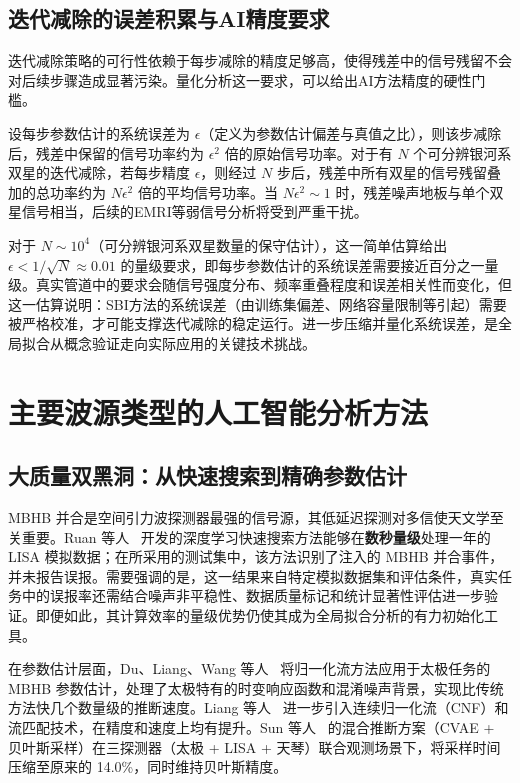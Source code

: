 \subsection{迭代减除的误差积累与AI精度要求}

迭代减除策略的可行性依赖于每步减除的精度足够高，使得残差中的信号残留不会对后续步骤造成显著污染。量化分析这一要求，可以给出AI方法精度的硬性门槛。

设每步参数估计的系统误差为 $\epsilon$（定义为参数估计偏差与真值之比），则该步减除后，残差中保留的信号功率约为 $\epsilon^2$ 倍的原始信号功率。对于有 $N$ 个可分辨银河系双星的迭代减除，若每步精度 $\epsilon$，则经过 $N$ 步后，残差中所有双星的信号残留叠加的总功率约为 $N\epsilon^2$ 倍的平均信号功率。当 $N\epsilon^2 \sim 1$ 时，残差噪声地板与单个双星信号相当，后续的EMRI等弱信号分析将受到严重干扰。

对于 $N\sim10^4$（可分辨银河系双星数量的保守估计），这一简单估算给出 $\epsilon < 1/\sqrt{N} \approx 0.01$ 的量级要求，即每步参数估计的系统误差需要接近百分之一量级。真实管道中的要求会随信号强度分布、频率重叠程度和误差相关性而变化，但这一估算说明：SBI方法的系统误差（由训练集偏差、网络容量限制等引起）需要被严格校准，才可能支撑迭代减除的稳定运行。进一步压缩并量化系统误差，是全局拟合从概念验证走向实际应用的关键技术挑战。

\section{主要波源类型的人工智能分析方法}

\subsection{大质量双黑洞：从快速搜索到精确参数估计}

MBHB 并合是空间引力波探测器最强的信号源，其低延迟探测对多信使天文学至关重要。Ruan 等人~\cite{ruan2023mbhb} 开发的深度学习快速搜索方法能够在\textbf{数秒量级}处理一年的 LISA 模拟数据；在所采用的测试集中，该方法识别了注入的 MBHB 并合事件，并未报告误报。需要强调的是，这一结果来自特定模拟数据集和评估条件，真实任务中的误报率还需结合噪声非平稳性、数据质量标记和统计显著性评估进一步验证。即便如此，其计算效率的量级优势仍使其成为全局拟合分析的有力初始化工具。

在参数估计层面，Du、Liang、Wang 等人~\cite{du2024normflow} 将归一化流方法应用于太极任务的 MBHB 参数估计，处理了太极特有的时变响应函数和混淆噪声背景，实现比传统方法快几个数量级的推断速度。Liang 等人~\cite{liang2024cnfmbhb} 进一步引入连续归一化流（CNF）和流匹配技术，在精度和速度上均有提升。Sun 等人~\cite{sun2025cvae} 的混合推断方案（CVAE + 贝叶斯采样）在三探测器（太极 + LISA + 天琴）联合观测场景下，将采样时间压缩至原来的 14.0\%，同时维持贝叶斯精度。

